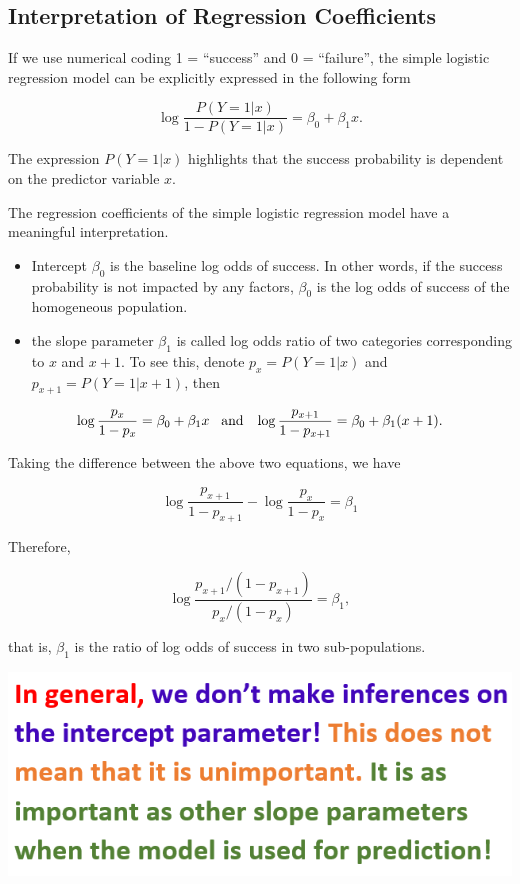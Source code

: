 \documentclass[
]{book}
\begin{document}
\hypertarget{interpretation-of-regression-coefficients-2}{%
\subsection{Interpretation of Regression Coefficients}\label{interpretation-of-regression-coefficients-2}}

If we use numerical coding 1 = ``success'' and 0 = ``failure'', the simple logistic regression model can be explicitly expressed in the following form

\[
\log \frac{P(Y=1|x)}{1-P(Y=1|x)}= \beta_0 + \beta_1x.
\]

The expression \(P(Y=1|x)\) highlights that the success probability is dependent on the predictor variable \(x\).

The regression coefficients of the simple logistic regression model have a meaningful interpretation.

\begin{itemize}
\item
  Intercept \(\beta_0\) is the baseline log odds of success. In other words, if the success probability is not impacted by any factors, \(\beta_0\) is the log odds of success of the homogeneous population.
\item
  the slope parameter \(\beta_1\) is called log odds ratio of two categories corresponding to \(x\) and \(x+1\). To see this, denote \(p_x = P(Y=1|x)\) and \(p_{x+1} = P(Y=1|x+1)\), then
\end{itemize}

\[
\log \frac{p_x}{1-p_x} = \beta_0 + \beta_1x\hspace{3mm} \mbox{and} \hspace{3mm} \log \frac{p_{x+1}}{1-p_{x+1}} = \beta_0 + \beta_1(x+1).
\]

Taking the difference between the above two equations, we have

\[
\log \frac{p_{x+1}}{1-p_{x+1}}- \log \frac{p_x}{1-p_x} = \beta_1
\]

Therefore,

\[
\log \frac{p_{x+1}/(1-p_{x+1})}{p_x/(1-p_x)} = \beta_1,
\]

that is, \(\beta_1\) is the ratio of log odds of success in two sub-populations.

\begin{center}\includegraphics[width=0.8\linewidth]{img06/w06-InterpretInterceptParameter} \end{center}
\end{document}
